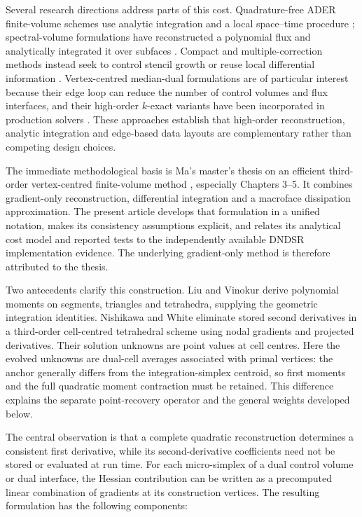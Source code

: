 \documentclass[11pt]{article}
\begin{document}
Several research directions address parts of this cost.  Quadrature-free ADER finite-volume schemes use analytic integration and a local space--time procedure \cite{dumbser2007}; spectral-volume formulations have reconstructed a polynomial flux and analytically integrated it over subfaces \cite{wang2002sv,harris2008}.  Compact and multiple-correction methods instead seek to control stencil growth or reuse local differential information \cite{pont2017,wang2017}.  Vertex-centred median-dual formulations are of particular interest because their edge loop can reduce the number of control volumes and flux interfaces, and their high-order $k$-exact variants have been incorporated in production solvers \cite{setzwein2021,setzwein2022}.  These approaches establish that high-order reconstruction, analytic integration and edge-based data layouts are complementary rather than competing design choices.

The immediate methodological basis is Ma's master's thesis on an efficient third-order vertex-centred finite-volume method \cite{ma2026thesis}, especially Chapters 3--5.  It combines gradient-only reconstruction, differential integration and a macroface dissipation approximation.  The present article develops that formulation in a unified notation, makes its consistency assumptions explicit, and relates its analytical cost model and reported tests to the independently available DNDSR implementation evidence.  The underlying gradient-only method is therefore attributed to the thesis.

Two antecedents clarify this construction.  Liu and Vinokur \cite{liu1998} derive polynomial moments on segments, triangles and tetrahedra, supplying the geometric integration identities.  Nishikawa and White \cite{nishikawa2023} eliminate stored second derivatives in a third-order cell-centred tetrahedral scheme using nodal gradients and projected derivatives.  Their solution unknowns are point values at cell centres.  Here the evolved unknowns are dual-cell averages associated with primal vertices: the anchor generally differs from the integration-simplex centroid, so first moments and the full quadratic moment contraction must be retained.  This difference explains the separate point-recovery operator and the general weights developed below.

The central observation is that a complete quadratic reconstruction determines a consistent first derivative, while its second-derivative coefficients need not be stored or evaluated at run time.  For each micro-simplex of a dual control volume or dual interface, the Hessian contribution can be written as a precomputed linear combination of gradients at its construction vertices.  The resulting formulation has the following components:
\end{document}
